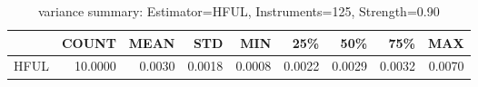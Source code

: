 \begin{table}[ht]
\centering
\caption{variance summary: Estimator=HFUL, Instruments=125, Strength=0.90}
\begin{tabular}{lrrrrrrrr}
\toprule
 & COUNT & MEAN & STD & MIN & 25\% & 50\% & 75\% & MAX \\
\midrule
HFUL & 10.0000 & 0.0030 & 0.0018 & 0.0008 & 0.0022 & 0.0029 & 0.0032 & 0.0070 \\
\bottomrule
\end{tabular}
\end{table}
